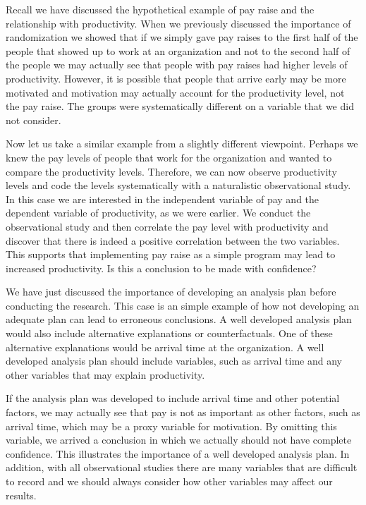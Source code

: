 \documentclass[]{book}
\theoremstyle{definition}
\theoremstyle{definition}
\theoremstyle{definition}
\theoremstyle{remark}
\begin{document}
Recall we have discussed the hypothetical example of pay raise and the
relationship with productivity. When we previously discussed the
importance of randomization we showed that if we simply gave pay raises
to the first half of the people that showed up to work at an
organization and not to the second half of the people we may actually
see that people with pay raises had higher levels of productivity.
However, it is possible that people that arrive early may be more
motivated and motivation may actually account for the productivity
level, not the pay raise. The groups were systematically different on a
variable that we did not consider.

Now let us take a similar example from a slightly different viewpoint.
Perhaps we knew the pay levels of people that work for the organization
and wanted to compare the productivity levels. Therefore, we can now
observe productivity levels and code the levels systematically with a
naturalistic observational study. In this case we are interested in the
independent variable of pay and the dependent variable of productivity,
as we were earlier. We conduct the observational study and then
correlate the pay level with productivity and discover that there is
indeed a positive correlation between the two variables. This supports
that implementing pay raise as a simple program may lead to increased
productivity. Is this a conclusion to be made with confidence?

We have just discussed the importance of developing an analysis plan
before conducting the research. This case is an simple example of how
not developing an adequate plan can lead to erroneous conclusions. A
well developed analysis plan would also include alternative explanations
or counterfactuals. One of these alternative explanations would be
arrival time at the organization. A well developed analysis plan should
include variables, such as arrival time and any other variables that may
explain productivity.

If the analysis plan was developed to include arrival time and other
potential factors, we may actually see that pay is not as important as
other factors, such as arrival time, which may be a proxy variable for
motivation. By omitting this variable, we arrived a conclusion in which
we actually should not have complete confidence. This illustrates the
importance of a well developed analysis plan. In addition, with all
observational studies there are many variables that are difficult to
record and we should always consider how other variables may affect our
results.
\end{document}
